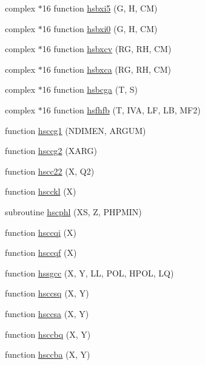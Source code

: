 \begin{DoxyCompactItemize}
\item 
complex $\ast$16 function \hyperlink{djangoh__h_8f_a1621d429d11e21c0ae1599f626901aea}{hsbxi5} (G, H, C\+M)
\item 
complex $\ast$16 function \hyperlink{djangoh__h_8f_a492a2e1e1e804fc597f8106ff0f9d32d}{hsbxi0} (G, H, C\+M)
\item 
complex $\ast$16 function \hyperlink{djangoh__h_8f_a8b69a1c6406582be624108c3aeda9778}{hsbxcv} (R\+G, R\+H, C\+M)
\item 
complex $\ast$16 function \hyperlink{djangoh__h_8f_a22ad387aac25047b40cfa42010b03f18}{hsbxca} (R\+G, R\+H, C\+M)
\item 
complex $\ast$16 function \hyperlink{djangoh__h_8f_a781ec07a20463ca988388d2121eb94d5}{hsbcga} (T, S)
\item 
complex $\ast$16 function \hyperlink{djangoh__h_8f_a5d39508d58f522981aa44d59b8d1d957}{hsfhfb} (T, I\+V\+A, L\+F, L\+B, M\+F2)
\item 
function \hyperlink{djangoh__h_8f_aaaf0f64c1121c876322e2ffb671892ca}{hsccg1} (N\+D\+I\+M\+E\+N, A\+R\+G\+U\+M)
\item 
function \hyperlink{djangoh__h_8f_ad782a8300eee4dbbf48f601d5edf7b51}{hsccg2} (X\+A\+R\+G)
\item 
function \hyperlink{djangoh__h_8f_a9316859837231a7b987eafbd324d75eb}{hscc22} (X, Q2)
\item 
function \hyperlink{djangoh__h_8f_aed992d5dc5fb25be3013764283c558c7}{hscckl} (X)
\item 
subroutine \hyperlink{djangoh__h_8f_ac0cdf5845e2bc8c727f04dc6887522ac}{hscphl} (X\+S, Z, P\+H\+P\+M\+I\+N)
\item 
function \hyperlink{djangoh__h_8f_a7f1bc2a8736ba4d6676ee875f2e8e7e9}{hsccqi} (X)
\item 
function \hyperlink{djangoh__h_8f_a32a2e6eec39c323750ec10615a705826}{hsccqf} (X)
\item 
function \hyperlink{djangoh__h_8f_ab69b3a52583e8911c01842f23c7c0657}{hssgcc} (X, Y, L\+L, P\+O\+L, H\+P\+O\+L, L\+Q)
\item 
function \hyperlink{djangoh__h_8f_af7cd27b63b8c68073aeb69bba07489f6}{hsccsq} (X, Y)
\item 
function \hyperlink{djangoh__h_8f_a538a166b17d02e3d254e563bc9938666}{hsccsa} (X, Y)
\item 
function \hyperlink{djangoh__h_8f_a9af05d67c2a86759ce42c81dbf6dbf63}{hsccbq} (X, Y)
\item 
function \hyperlink{djangoh__h_8f_aa99d913eafcd30df292bf796dbc1fc88}{hsccba} (X, Y)

\end{DoxyCompactItemize}

